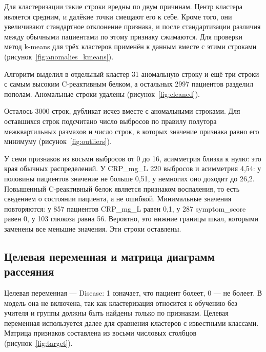\documentclass[a4paper,14pt]{extarticle}
\begin{document}
Для кластеризации такие строки вредны по двум причинам. Центр кластера является средним, и далёкие точки смещают его к себе. Кроме того, они увеличивают стандартное отклонение признака, и после стандартизации различия между обычными пациентами по этому признаку сжимаются. Для проверки метод k-means для трёх кластеров применён к данным вместе с этими строками (рисунок~\ref{fig:anomalies_kmeans}).


Алгоритм выделил в отдельный кластер 31 аномальную строку и ещё три строки с самым высоким C-реактивным белком, а остальных 2997 пациентов разделил пополам. Аномальные строки удалены (рисунок~\ref{fig:cleaned}).


Осталось 3000 строк, дубликат исчез вместе с аномальными строками. Для оставшихся строк подсчитано число выбросов по правилу полутора межквартильных размахов и число строк, в которых значение признака равно его минимуму (рисунок~\ref{fig:outliers}).


У семи признаков из восьми выбросов от 0 до 16, асимметрия близка к нулю: это края обычных распределений. У CRP\_mg\_L 220 выбросов и асимметрия 4,54: у половины пациентов значение не больше 0,51, у немногих оно доходит до 26,2. Повышенный C-реактивный белок является признаком воспаления, то есть сведением о состоянии пациента, а не ошибкой. Минимальные значения повторяются: у 857 пациентов CRP\_mg\_L равен 0,1, у 287 symptom\_score равен 0, у 103 глюкоза равна 56. Вероятно, это нижние границы шкал, которыми заменены все меньшие значения. Эти строки оставлены.

\subsection{Целевая переменная и матрица диаграмм рассеяния}

Целевая переменная — Disease: 1 означает, что пациент болеет, 0 — не болеет. В модель она не включена, так как кластеризация относится к обучению без учителя и группы должны быть найдены только по признакам. Целевая переменная используется далее для сравнения кластеров с известными классами. Матрица признаков составлена из восьми числовых столбцов (рисунок~\ref{fig:target}).
\end{document}
